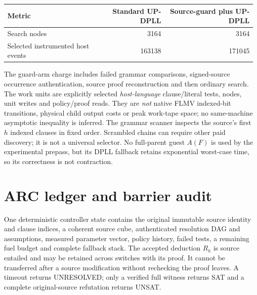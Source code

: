 \documentclass[11pt]{article}
\begin{document}
\begin{center}\begin{tabular}{lrr}
\toprule
Metric&Standard UP-DPLL&Source-guard plus UP-DPLL\\\midrule
Search nodes&3164&3164\\
Selected instrumented host events&163138&171045\\\bottomrule
\end{tabular}\end{center}
The guard-arm charge includes failed grammar comparisons, signed-source
occurrence authentication, source proof reconstruction and then
ordinary search. The work units are explicitly selected
\emph{host-language} clause/literal tests, nodes, unit writes
and policy/proof reads. They are \emph{not} native FLMV
indexed-bit transitions, physical child output costs or peak work-tape
space; no same-machine asymptotic inequality is inferred.
The grammar scanner inspects the source's first $h$ indexed clauses in
fixed order. Scrambled chains can require other paid discovery; it
is not a universal selector. No full-parent guest $A(F)$ is
used by the experimental prepass, but its DPLL fallback retains
exponential worst-case time, so its correctness is not contraction.

\section{ARC ledger and barrier audit}
One deterministic controller state contains the original immutable
source identity and clause indices, a coherent source cube, authenticated
resolution DAG and assumptions, measured parameter vector, policy
history, failed tests, a remaining fuel budget and complete fallback
stack. The accepted deduction $R_h$ is source entailed and may be
retained across switches with its proof. It cannot be transferred
after a source modification without rechecking the proof leaves.
A timeout returns UNRESOLVED; only a verified full witness returns
SAT and a complete original-source refutation returns UNSAT.
\end{document}
